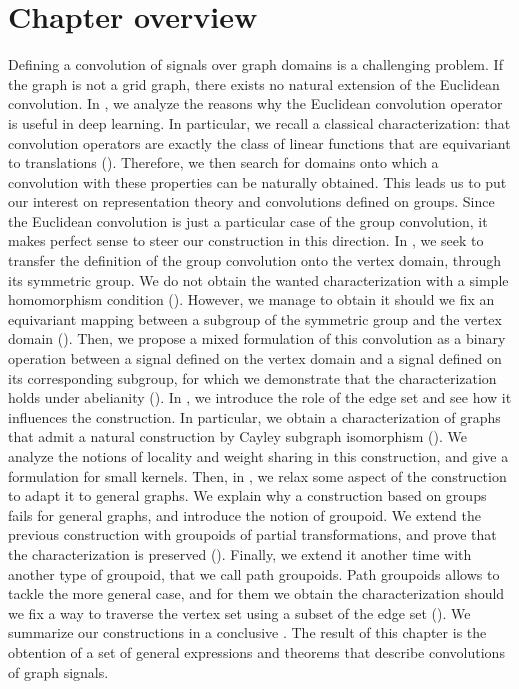 \section*{Chapter overview}

Defining a convolution of signals over graph domains is a challenging problem. If the graph is not a grid graph, there exists no natural extension of the Euclidean convolution. In , we analyze the reasons why the Euclidean convolution operator is useful in deep learning. In particular, we recall a classical characterization: that convolution operators are exactly the class of linear functions that are equivariant to translations (). Therefore, we then search for domains onto which a convolution with these properties can be naturally obtained. This leads us to put our interest on representation theory and convolutions defined on groups. Since the Euclidean convolution is just a particular case of the group convolution, it makes perfect sense to steer our construction in this direction. In , we seek to transfer the definition of the group convolution onto the vertex domain, through its symmetric group. We do not obtain the wanted characterization with a simple homomorphism condition (). However, we manage to obtain it should we fix an equivariant mapping between a subgroup of the symmetric group and the vertex domain (). Then, we propose a mixed formulation of this convolution as a binary operation between a signal defined on the vertex domain and a signal defined on its corresponding subgroup, for which we demonstrate that the characterization holds under abelianity (). In , we introduce the role of the edge set and see how it influences the construction. In particular, we obtain a characterization of graphs that admit a natural construction by Cayley subgraph isomorphism (). We analyze the notions of locality and weight sharing in this construction, and give a formulation for small kernels. Then, in , we relax some aspect of the construction to adapt it to general graphs. We explain why a construction based on groups fails for general graphs, and introduce the notion of groupoid. We extend the previous construction with groupoids of partial transformations, and prove that the characterization is preserved (). Finally, we extend it another time with another type of groupoid, that we call path groupoids. Path groupoids allows to tackle the more general case, and for them we obtain the characterization should we fix a way to traverse the vertex set using a subset of the edge set (). We summarize our constructions in a conclusive . The result of this chapter is the obtention of a set of general expressions and theorems that describe convolutions of graph signals.